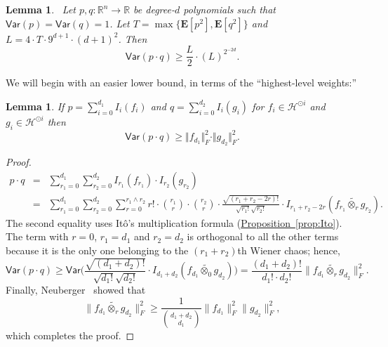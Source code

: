 \documentclass[11pt]{article}
\numberwithin{equation}{section}
\newtheorem{lemma}[theorem]{Lemma}
\theoremstyle{definition}
\theoremstyle{plain}
\newcommand{\expref}[2]{\hyperref[#2]{#1~\ref{#2}}}
\begin{document}
\begin{lemma}~\label{lemma:variance-product-lower}
Let $p, q: \mathbb{R}^n \rightarrow \mathbb{R}$ be degree-$d$ polynomials such that $\mathsf{Var}(p) = \mathsf{Var}(q)=1$. Let $T = \max \{\mathbf{E}[p^2], \mathbf{E}[q^2]\}$ and 
$L=4 \cdot T \cdot 9^{d+1} \cdot (d+1)^2$. 
Then
\[
\mathsf{Var}(p \cdot q) \ge \frac{L}{2} \cdot (L)^{2^{-2d}}. 
\] 
\end{lemma}

We will begin with an easier lower bound, in terms of the ``highest-level weights:''
\begin{lemma}\label{lem:variance-bound}
    If $p = \sum_{i=0}^{d_1} I_i(f_i)$ and $q = \sum_{i=0}^{d_2} I_i(g_i)$
    for $f_i \in \mathcal{H}^{\odot i}$ and $g_i \in \mathcal{H}^{\odot i}$ then
\[
\mathsf{Var}(p \cdot q) \ge {\Vert f_{d_1} \Vert_F^2 \cdot \Vert g_{d_2} \Vert_F^2}.
\] 
\end{lemma}
\begin{proof} 
\begin{eqnarray*}
p \cdot q &=& \sum_{r_1=0}^{d_1} \sum_{r_2=0}^{d_2} I_{r_1}(f_{r_1}) \cdot I_{r_2}(g_{r_2})  \\
&=& \sum_{r_1=0}^{d_1} \sum_{r_2=0}^{d_2} \sum_{r=0}^{r_1 \wedge r_2} r! \cdot \binom{r_1}{r} \cdot \binom{r_2}{r} \cdot \frac{\sqrt{(r_1+r_2 - 2r)!}}{\sqrt{r_1!}\sqrt{r_2!}} \cdot I_{r_1+r_2 - 2r} (f_{r_1} \widetilde{\otimes_r} g_{r_2}). 
\end{eqnarray*}
The second equality uses It\^{o}'s multiplication formula
(\expref{Proposition}{prop:Ito}). The term with $r=0$, $r_1= d_1$ and
$r_2=d_2$ is orthogonal to all the other terms because it is the only
one belonging to the $(r_1 + r_2)$th Wiener chaos; hence,
\[
\mathsf{Var}(p \cdot q) \ge \mathsf{Var} \bigg( \frac{\sqrt{(d_1+d_2 )!}}{\sqrt{d_1!}\sqrt{d_2!}}  \cdot I_{d_1+d_2} (f_{d_1} \widetilde{\otimes_0} g_{d_2}) \bigg)
= \frac{(d_1 + d_2)!}{d_1! \cdot d_2!} \|f_{d_1} \widetilde{\otimes_r} g_{d_2}\|_F^2.
\]
Finally, Neuberger~\cite{Neuberger:74} showed that
\[
  \|f_{d_1} \widetilde{\otimes_r} g_{d_2}\|_F^2 \ge \frac{1}{\binom{d_1 + d_2}{d_1}} \|f_{d_1}\|_F^2 \|g_{d_2}\|_F^2,
\]
which completes the proof.
\end{proof}
\end{document}
